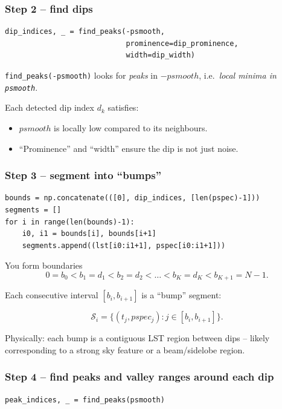 \documentclass[11pt]{article}
\begin{document}
\subsubsection*{Step 2 -- find dips}

\begin{verbatim}
dip_indices, _ = find_peaks(-psmooth,
                            prominence=dip_prominence,
                            width=dip_width)
\end{verbatim}

\texttt{find\_peaks(-psmooth)} looks for \emph{peaks} in $-psmooth$, i.e.\ \emph{local minima in \texttt{psmooth}}.

Each detected dip index $d_k$ satisfies:

\begin{itemize}[leftmargin=*]
  \item $psmooth$ is locally low compared to its neighbours.
  \item ``Prominence'' and ``width'' ensure the dip is not just noise.
\end{itemize}

\subsubsection*{Step 3 -- segment into ``bumps''}

\begin{verbatim}
bounds = np.concatenate(([0], dip_indices, [len(pspec)-1]))
segments = []
for i in range(len(bounds)-1):
    i0, i1 = bounds[i], bounds[i+1]
    segments.append((lst[i0:i1+1], pspec[i0:i1+1]))
\end{verbatim}

You form boundaries
\[
  0 = b_0 < b_1 = d_1 < b_2 = d_2 < \dots < b_K = d_K < b_{K+1} = N-1.
\]

Each consecutive interval $[b_i, b_{i+1}]$ is a ``bump'' segment:

\[
  \mathcal{S}_i = \{(t_j, pspec_j): j \in [b_i, b_{i+1}]\}.
\]

Physically: each bump is a contiguous LST region between dips -- likely corresponding to a strong sky feature or a beam/sidelobe region.

\subsubsection*{Step 4 -- find peaks and valley ranges around each dip}

\begin{verbatim}
peak_indices, _ = find_peaks(psmooth)
\end{verbatim}
\end{document}
